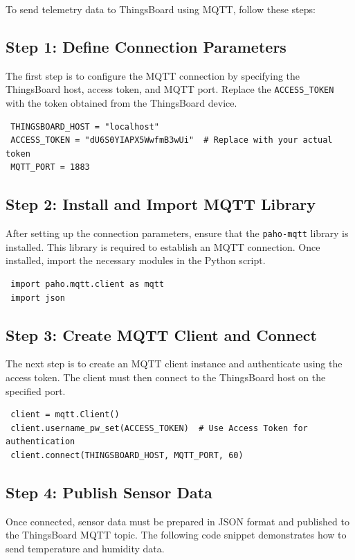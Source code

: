 \documentclass[a4paper,12pt]{report}
\begin{document}
 To send telemetry data to ThingsBoard using MQTT, follow these steps:
 
 \subsection{Step 1: Define Connection Parameters}
 The first step is to configure the MQTT connection by specifying the ThingsBoard host, access token, and MQTT port. Replace the \texttt{ACCESS\_TOKEN} with the token obtained from the ThingsBoard device.
 
 \begin{lstlisting}
 THINGSBOARD_HOST = "localhost"
 ACCESS_TOKEN = "dU6S0YIAPX5WwfmB3wUi"  # Replace with your actual token
 MQTT_PORT = 1883
 \end{lstlisting}
 
 \subsection{Step 2: Install and Import MQTT Library}
 After setting up the connection parameters, ensure that the \texttt{paho-mqtt} library is installed. This library is required to establish an MQTT connection. Once installed, import the necessary modules in the Python script.
 
 \begin{lstlisting}
 import paho.mqtt.client as mqtt
 import json
 \end{lstlisting}
 
 \subsection{Step 3: Create MQTT Client and Connect}
 The next step is to create an MQTT client instance and authenticate using the access token. The client must then connect to the ThingsBoard host on the specified port.
 
 \begin{lstlisting}
 client = mqtt.Client()
 client.username_pw_set(ACCESS_TOKEN)  # Use Access Token for authentication
 client.connect(THINGSBOARD_HOST, MQTT_PORT, 60)
 \end{lstlisting}
 
 \subsection{Step 4: Publish Sensor Data}
 Once connected, sensor data must be prepared in JSON format and published to the ThingsBoard MQTT topic. The following code snippet demonstrates how to send temperature and humidity data.
 
\end{document}
